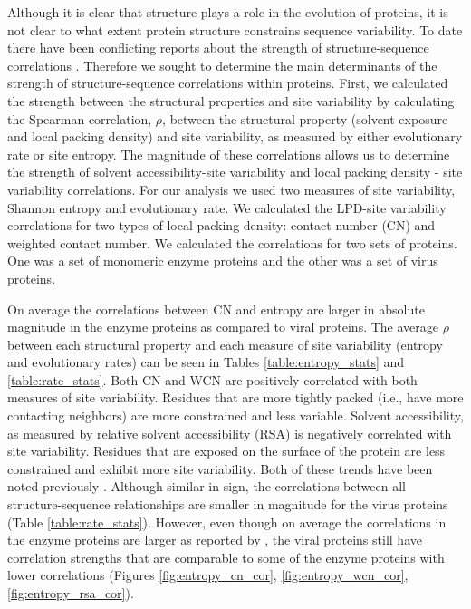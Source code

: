\documentclass[12pt]{article}
\begin{document}
Although it is clear that structure plays a role in the evolution of proteins, it is not clear to what extent protein structure constrains sequence variability. To date there have been conflicting reports about the strength of structure-sequence correlations \citep{Yehetal2014b, Shahmoradietal2014}. Therefore we sought to determine the main determinants of the strength of structure-sequence correlations within proteins. First, we calculated the strength between the structural properties and site variability by calculating the Spearman correlation, $\rho$, between the structural property (solvent exposure and local packing density) and site variability, as measured by either evolutionary rate or site entropy. The magnitude of these correlations allows us to determine the strength of solvent accessibility-site variability and local packing density - site variability correlations. For our analysis we used two measures of site variability, Shannon entropy and evolutionary rate. We calculated the LPD-site variability correlations for two types of local packing density: contact number (CN) and weighted contact number. We calculated the correlations for two sets of proteins. One was a set of monomeric enzyme proteins and the other was a set of virus proteins.

\indent On average the correlations between CN and entropy are larger in absolute magnitude in the enzyme proteins as compared to viral proteins. The average $\rho$ between each structural property and each measure of site variability (entropy and evolutionary rates) can be seen in Tables \ref{table:entropy_stats} and \ref{table:rate_stats}. Both CN and WCN are positively correlated with  both measures of site variability. Residues that are more tightly packed (i.e., have more contacting neighbors) are more constrained and less variable. Solvent accessibility, as measured by relative solvent accessibility (RSA) is negatively correlated with site variability. Residues that are exposed on the surface of the protein are less constrained and exhibit more site variability. Both of these trends have been noted previously \citep{Yehetal2014a, Yehetal2014b, Shahmoradietal2014, Liaoetal2005, Fransozaetal2009}. Although similar in sign, the correlations between all structure-sequence relationships are smaller in magnitude for the virus proteins (Table \ref{table:rate_stats}). However, even though on average the correlations in the enzyme proteins are larger as reported by \cite{Yehetal2014a}, the viral proteins still have correlation strengths that are comparable to some of the enzyme proteins with lower correlations (Figures \ref{fig:entropy_cn_cor}, \ref{fig:entropy_wcn_cor}, \ref{fig:entropy_rsa_cor}). 
\end{document}
